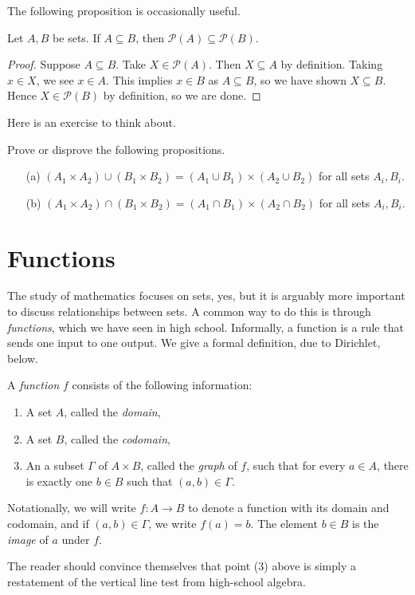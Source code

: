 \documentclass{article}
\begin{document}
The following proposition is occasionally useful.
\begin{proposition}
Let $A,B$ be sets. If $A\subseteq B$, then $\mathcal P(A) \subseteq \mathcal P(B)$.
\end{proposition}
\begin{proof}
Suppose $A\subseteq B$. Take $X\in \mathcal P(A)$. Then $X\subseteq A$ by definition. Taking $x\in X$, we see $x\in A$. This implies $x\in B$ as $A\subseteq B$, so we have shown $X\subseteq B$. Hence $X\in \mathcal P(B)$ by definition, so we are done.
\end{proof}

Here is an exercise to think about.
\begin{exercise}
Prove or disprove the following propositions.
\begin{itemize}
    \item[(a)] $(A_1\times A_2)\cup (B_1\times B_2) = (A_1\cup B_1)\times (A_2\cup B_2)$ for all sets $A_i, B_i$.
    \item[(b)] $(A_1\times A_2)\cap (B_1\times B_2) = (A_1\cap B_1)\times (A_2\cap B_2)$ for all sets $A_i, B_i$.
\end{itemize}
\end{exercise}
\newpage
 
\section{Functions}
The study of mathematics focuses on sets, yes, but it is arguably more important to discuss relationships between sets. A common way to do this is through \textit{functions}, which we have seen in high school. Informally, a function is a rule that sends one input to one output. We give a formal definition, due to Dirichlet, below.
\begin{definition}
A \textit{function} $f$ consists of the following information:
\begin{enumerate}
    \item A set $A$, called the \textit{domain},
    \item A set $B$, called the \textit{codomain},
    \item An a subset $\Gamma$ of $A\times B$, called the \textit{graph} of $f$, such that for every $a\in A$, there is exactly one $b\in B$ such that $(a,b)\in\Gamma$.
\end{enumerate}
Notationally, we will write $f: A\to B$ to denote a function with its domain and codomain, and if $(a, b)\in \Gamma$, we write $f(a) = b$. The element $b\in B$ is the \textit{image} of $a$ under $f$.
\end{definition}
The reader should convince themselves that point (3) above is simply a restatement of the vertical line test from high-school algebra.
\end{document}
